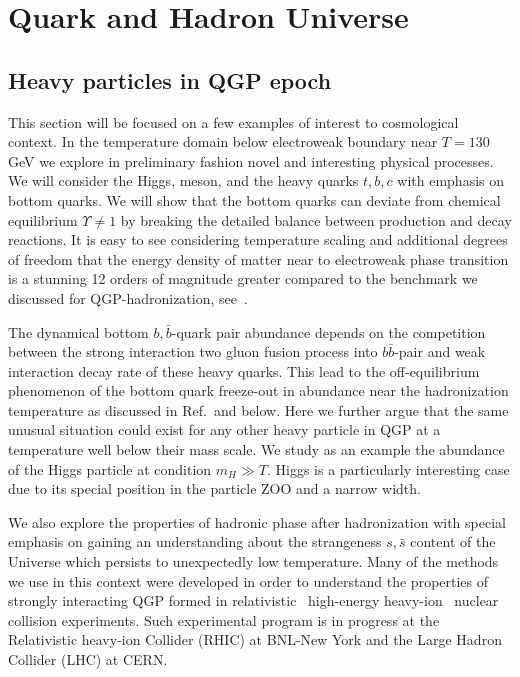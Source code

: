 \section{Quark and Hadron Universe}\label{part2}
\subsection{Heavy particles in QGP epoch}
\label{HiggsQGP}
This section will be focused on a few examples of interest to cosmological context. In the temperature domain below electroweak boundary near $T=130$\,GeV we explore in preliminary fashion novel and interesting physical processes. We will consider the Higgs, meson, and the heavy quarks $t,b,c$ with emphasis on bottom quarks. We will show that the bottom quarks can deviate from chemical equilibrium $\Upsilon\neq 1$ by breaking the detailed balance between production and decay reactions. It is easy to see considering temperature scaling and additional degrees of freedom that the energy density of matter near to electroweak phase transition is a stunning 12 orders of magnitude greater compared to the benchmark we discussed for QGP-hadronization, see~.
 
The dynamical bottom $ b,\bar b$-quark pair abundance depends on the competition between the strong interaction two gluon fusion process into $b\bar b$-pair and weak interaction decay rate of these heavy quarks. This lead to the off-equilibrium phenomenon of the bottom quark freeze-out in abundance near the hadronization temperature as discussed in Ref.\,\cite{Yang:2020nne} and below. Here we further argue that the same unusual situation could exist for any other heavy particle in QGP at a temperature well below their mass scale. We study as an example the abundance of the Higgs particle at condition $m_H\gg T$. Higgs is a particularly interesting case due to its special position in the particle ZOO and a narrow width.

We also explore the properties of hadronic phase after hadronization with special emphasis on gaining an understanding about the strangeness $s,\bar s$ content of the Universe which persists to unexpectedly low temperature. Many of the methods we use in this context were developed in order to understand the properties of strongly interacting QGP formed in relativistic \ie\ high-energy heavy-ion \ie\ nuclear collision experiments. Such experimental program is in progress at the Relativistic heavy-ion Collider (RHIC) at BNL-New York and the Large Hadron Collider (LHC) at CERN. 


